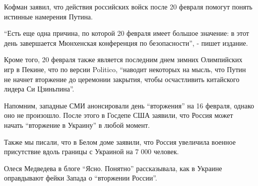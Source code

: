 Кофман заявил, что действия российских войск после 20 февраля помогут понять
истинные намерения Путина.

\enquote{Есть еще одна причина, по которой 20 февраля имеет большое значение: в этот
день завершается Мюнхенская конференция по безопасности}, - пишет издание.

Кроме того, 20 февраля также является последним днем зимних Олимпийских игр в
Пекине, что по версии Politico, \enquote{наводит некоторых на мысль, что Путин не
начнет вторжение до церемонии закрытия, чтобы осчастливить китайского лидера Си
Цзиньпина}.

Напомним, западные СМИ анонсировали день \enquote{вторжения} на 16 февраля, однако оно
не произошло. После этого в Госдепе США заявили, что Россия может начать
\enquote{вторжение в Украину} в любой момент.

Также мы писали, что в Белом доме заявили, что Россия увеличила военное
присутствие вдоль границы с Украиной на 7 000 человек.

Олеся Медведева в блоге \enquote{Ясно. Понятно} рассказывала, как в Украине оправдывают
фейки Запада о \enquote{вторжении России}. 


